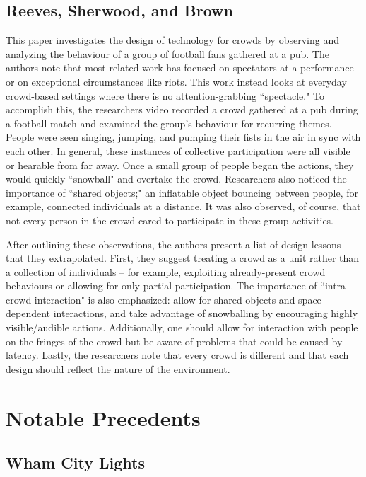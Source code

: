 \subsection{Reeves, Sherwood, and Brown}

This paper investigates the design of technology for crowds by observing and analyzing the behaviour of a group of football fans gathered at a pub. The authors note that most related work has focused on spectators at a performance or on exceptional circumstances like riots. This work instead looks at everyday crowd-based settings where there is no attention-grabbing ``spectacle." To accomplish this, the researchers video recorded a crowd gathered at a pub during a football match and examined the group's behaviour for recurring themes. People were seen singing, jumping, and pumping their fists in the air in sync with each other. In general, these instances of collective participation were all visible or hearable from far away. Once a small group of people began the actions, they would quickly ``snowball" and overtake the crowd. Researchers also noticed the importance of ``shared objects;" an inflatable object bouncing between people, for example, connected individuals at a distance. It was also observed, of course, that not every person in the crowd cared to participate in these group activities.

After outlining these observations, the authors present a list of design lessons that they extrapolated. First, they suggest treating a crowd as a unit rather than a collection of individuals -- for example, exploiting already-present crowd behaviours or allowing for only partial participation. The importance of ``intra-crowd interaction" is also emphasized: allow for shared objects and space-dependent interactions, and take advantage of snowballing by encouraging highly visible/audible actions. Additionally, one should allow for interaction with people on the fringes of the crowd but be aware of problems that could be caused by latency. Lastly, the researchers note that every crowd is different and that each design should reflect the nature of the environment.

\section{Notable Precedents}

\subsection{Wham City Lights}

